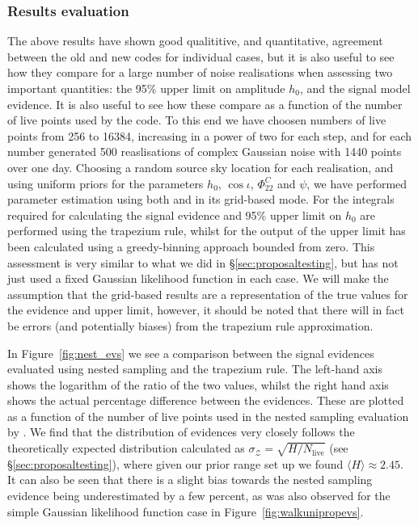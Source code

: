 \subsubsection{Results evaluation}\label{sec:reseval}

The above results have shown good qualititive, and quantitative, agreement between the old and new codes for individual cases, but it is also useful
to see how they compare for a large number of noise realisations when assessing two important quantities: the 95\% upper limit on \gw amplitude $h_0$,
and the signal model evidence. It is also useful to see how these compare as a function of the number of live points used by the code. To this end we
have choosen numbers of live points from 256 to 16384, increasing in a power of two for each step, and for each number generated 500 reaslisations of
complex Gaussian noise with 1440 points over one day. Choosing a random source sky location for each realisation, and using uniform priors for the
parameters $h_0$, $\cos{\iota}$, $\Phi_{22}^C$ and $\psi$, we have performed parameter estimation using both \lppen and \lppe in its grid-based mode.
For \lppe the integrals required for calculating the signal evidence and 95\% upper limit on $h_0$ are performed using the trapezium rule, whilst
for the output of \lppen the upper limit has been calculated using a greedy-binning approach bounded from zero. This assessment is very similar to what
we did in \S\ref{sec:proposaltesting}, but has not just used a fixed Gaussian likelihood function in each case. We will make the assumption that the
grid-based results are a representation of the true values for the evidence and upper limit, however, it should be noted that there will in fact be
errors (and potentially biases) from the trapezium rule approximation.

In Figure~\ref{fig:nest_evs} we see a comparison between the signal evidences evaluated using nested sampling and the trapezium rule. The left-hand
axis shows the logarithm of the ratio of the two values, whilst the right hand axis shows the actual percentage difference between the evidences. These
are plotted as a function of the number of live points used in the nested sampling evaluation by \lppen. We find that the distribution of evidences
very closely follows the theoretically expected distribution calculated as $\sigma_{\mathcal{Z}} = \sqrt{H/N_{\text{live}}}$ (see
\S\ref{sec:proposaltesting}), where given our prior range set up we found $\langle H \rangle \approx 2.45$. It can also be seen that there is a slight
bias towards the nested sampling evidence being underestimated by a few percent, as was also observed for the simple Gaussian likelihood function case
in Figure~\ref{fig:walkunipropevs}.

